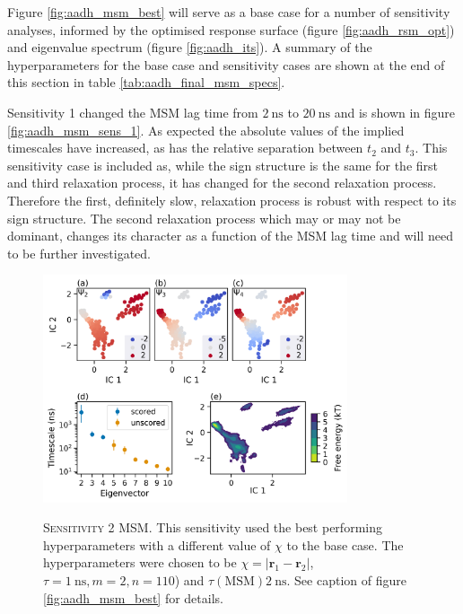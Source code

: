 Figure \ref{fig:aadh_msm_best} will serve as a base case for a number of sensitivity analyses, informed by the optimised response surface (figure \ref{fig:aadh_rsm_opt}) and eigenvalue spectrum (figure \ref{fig:aadh_its}). A summary of the hyperparameters for the base case and sensitivity cases are shown at the end of this section in table \ref{tab:aadh_final_msm_specs}. 

Sensitivity 1 changed the MSM lag time from $\SI{2}{\nano\second}$ to $\SI{20}{\nano\second}$ and is shown in figure \ref{fig:aadh_msm_sens_1}. As expected the absolute values of the implied timescales have increased, as has the relative separation between $t_{2}$ and $t_{3}$. 
This sensitivity case is included as,  while the sign structure is the same for the first and third relaxation process, it has changed for the second relaxation process.  Therefore the first, definitely slow, relaxation process is robust with respect to its sign structure. The second relaxation process which may or may not be dominant, changes its character as a function of the MSM lag time and will need to be further investigated. 

\begin{figure}
    \centering
    \caption[Sensitivity 2 MSM]{\textsc{Sensitivity 2 MSM}. This sensitivity used the best performing hyperparameters with a different value of $\chi$ to the base case. The hyperparameters were chosen to be $\chi= |\mathbf{r}_{1} - \mathbf{r}_{2}|$, $\tau = \SI{1}{\nano\second}, m=2, n=110$) and $\tau(\mathrm{MSM}) \SI{2}{\nano\second}$. See caption of figure \ref{fig:aadh_msm_best} for details.}
    \includegraphics[width=0.8\textwidth]{chapters/msm_optimization/figures/aadh_msm_sens_2.png}
    \label{fig:aadh_msm_sens_2}
\end{figure}

